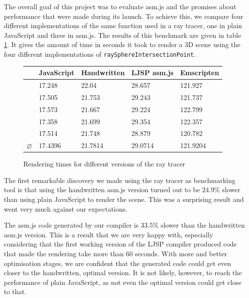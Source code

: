 \documentclass[11pt]{report}
\begin{document}
The overall goal of this project was to evaluate asm.js and the promises about performance that were made during its launch. To achieve this, we compare four different implementations of the same function used in a ray tracer, one in plain JavaScript and three in asm.js. The results of this benchmark are given in table \ref{benchmarks}. It gives the amount of time in seconds it took to render a 3D scene using the four different implementations of \texttt{raySphereIntersectionPoint}.
\begin{figure}[ht]
\begin{center}
  \begin{tabular}{ l | l | l | l | l }
    & JavaScript & Handwritten & LJSP asm.js & Emscripten \\ \hline
    & 17.248 & 22.04 & 28.657 & 121.927 \\
    & 17.505 & 21.753 & 29.243 & 121.737 \\
    & 17.573 & 21.667 & 29.224 & 122.799 \\
    & 17.358 & 21.699 & 29.354 & 122.357 \\
    & 17.514 & 21.748 & 28.879 & 120.782 \\ \hline
    $\varnothing$ & 17.4396 & 21.7814 & 29.0714 & 121.9204 \\
  \end{tabular}
\end{center}
\caption{Rendering times for different versions of the ray tracer}
\label{benchmarks}
\end{figure}

The first remarkable discovery we made using the ray tracer as benchmarking tool is that using the handwritten asm.js version turned out to be $24.9\%$ slower than using plain JavaScript to render the scene. This was a surprising result and went very much against our expectations.

The asm.js code generated by our compiler is $33.5\%$ slower than the handwritten asm.js version. This is a result that we are very happy with, especially considering that the first working version of the LJSP compiler produced code that made the rendering take more than 60 seconds. With more and better optimisation stages, we are confident that the generated code could get even closer to the handwritten, optimal version. It is not likely, however, to reach the performance of plain JavaScript, as not even the optimal version could get close to that.
\end{document}
